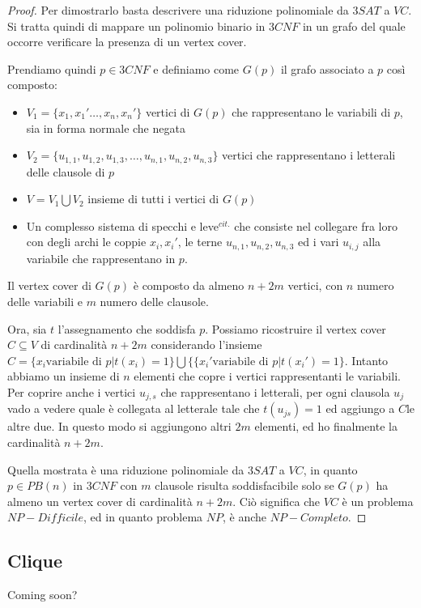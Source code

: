 \begin{proof}
    Per dimostrarlo basta descrivere una riduzione polinomiale da $3SAT$ a $VC$. Si tratta quindi di mappare un polinomio binario in $3CNF$ in un grafo del quale occorre verificare la presenza di un vertex cover.

    Prendiamo quindi $p \in 3CNF$ e definiamo come $G(p)$ il grafo associato a $p$ così composto:
    \begin{itemize}
        \item $V_1 = \{x_1, x_1' \ldots , x_n, x_n'\}$ vertici di $G(p)$ che rappresentano le variabili di $p$, sia in forma normale che negata
        \item $V_2 = \{u_{1,1}, u_{1,2}, u_{1,3}, \ldots , u_{n,1}, u_{n,2}, u_{n,3}\}$ vertici che rappresentano i letterali delle clausole di $p$
        \item $V = V_1 \bigcup V_2$ insieme di tutti i vertici di $G(p)$
        \item Un complesso sistema di specchi e leve$^{cit.}$ che consiste nel collegare fra loro con degli archi le coppie $x_i, x_i'$, le terne $u_{n,1}, u_{n,2}, u_{n,3}$ ed i vari $u_{i,j}$ alla variabile che rappresentano in $p$.
    \end{itemize}

    \begin{remark}
	    Il vertex cover di $G(p)$ è composto da almeno $n+2m$ vertici, con $n$ numero delle variabili e $m$ numero delle clausole.
    \end{remark}

    Ora, sia $t$ l'assegnamento che soddisfa $p$. Possiamo ricostruire il vertex cover $C \subseteq V$ di cardinalità $n+2m$ considerando l'insieme $C = \{x_i \text{variabile di } p | t(x_i)=1\} \bigcup \{\{x_i' \text{variabile di } p | t(x_i')=1\}$. Intanto abbiamo un insieme di $n$ elementi che copre i vertici rappresentanti le variabili. Per coprire anche i vertici $u_{j,s}$ che rappresentano i letterali, per ogni clausola $u_j$ vado a vedere quale è collegata al letterale tale che $t(u_{js}) = 1$ ed aggiungo a $C$le altre due. In questo modo si aggiungono altri $2m$ elementi, ed ho finalmente la cardinalità $n+2m$.

    Quella mostrata è una riduzione polinomiale da $3SAT$ a $VC$, in quanto $p \in PB(n)$ in $3CNF$ con $m$ clausole risulta soddisfacibile solo se $G(p)$ ha almeno un vertex cover di cardinalità $n+2m$. Ciò significa che $VC$ è un problema $NP-Difficile$, ed in quanto problema $NP$, è anche $NP-Completo$.
\end{proof}

\subsection{Clique}

Coming soon?
